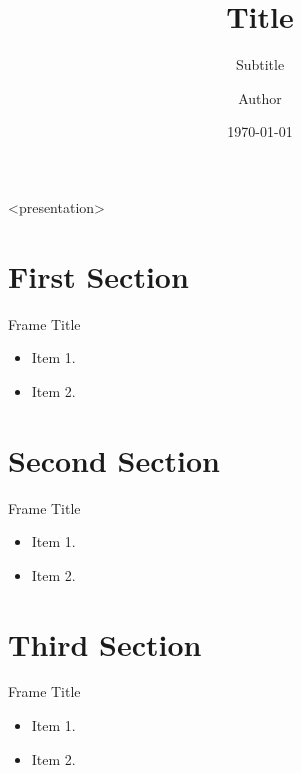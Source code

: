 \documentclass{beamer}
\title{Title}
\subtitle{Subtitle}
\author[]{Author}
\date{\today}
\begin{document}
\begin{frame}<presentation>
    \titlepage
\end{frame}


\section{First Section}

\begin{frame}{Frame Title}
  \begin{itemize}
  \item Item 1.
  \item Item 2.
  \end{itemize}
\end{frame}

\section{Second Section}

\begin{frame}{Frame Title}
  \begin{itemize}
  \item Item 1.
  \item Item 2.
  \end{itemize}
\end{frame}

\section{Third Section}

\begin{frame}{Frame Title}
  \begin{itemize}
  \item Item 1.
  \item Item 2.
  \end{itemize}
\end{frame}
\end{document}
